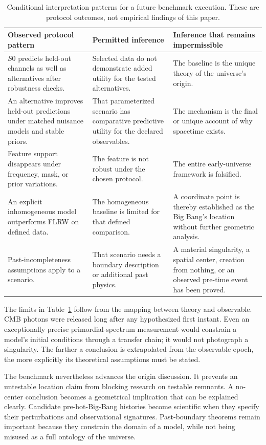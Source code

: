 \documentclass[10pt,conference]{IEEEtran}
\begin{document}
\begin{table}[!t]
\caption{Conditional interpretation patterns for a future benchmark execution. These are protocol outcomes, not empirical findings of this paper.}
\label{tab:expected-patterns}
\centering
\footnotesize
\begin{tabular}{p{}p{}p{}}
\toprule
Observed protocol pattern & Permitted inference & Inference that remains impermissible \\
\midrule
$S0$ predicts held-out channels as well as alternatives after robustness checks. & Selected data do not demonstrate added utility for the tested alternatives. & The baseline is the unique theory of the universe's origin. \\
An alternative improves held-out predictions under matched nuisance models and stable priors. & That parameterized scenario has comparative predictive utility for the declared observables. & The mechanism is the final or unique account of why spacetime exists. \\
Feature support disappears under frequency, mask, or prior variations. & The feature is not robust under the chosen protocol. & The entire early-universe framework is falsified. \\
An explicit inhomogeneous model outperforms FLRW on defined data. & The homogeneous baseline is limited for that defined comparison. & A coordinate point is thereby established as the Big Bang's location without further geometric analysis. \\
Past-incompleteness assumptions apply to a scenario. & That scenario needs a boundary description or additional past physics. & A material singularity, a spatial center, creation from nothing, or an observed pre-time event has been proved. \\
\bottomrule
\end{tabular}
\end{table}

The limits in Table~\ref{tab:expected-patterns} follow from the mapping between theory and observable. CMB photons were released long after any hypothesized first instant. Even an exceptionally precise primordial-spectrum measurement would constrain a model's initial conditions through a transfer chain; it would not photograph a singularity. The farther a conclusion is extrapolated from the observable epoch, the more explicitly its theoretical assumptions must be stated.

The benchmark nevertheless advances the origin discussion. It prevents an untestable location claim from blocking research on testable remnants. A no-center conclusion becomes a geometrical implication that can be explained clearly. Candidate pre-hot-Big-Bang histories become scientific when they specify their perturbations and observational signatures. Past-boundary theorems remain important because they constrain the domain of a model, while not being misused as a full ontology of the universe.
\end{document}
